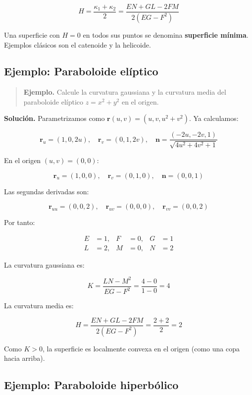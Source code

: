 \documentclass[
]{book}
\begin{document}
\[
H = \frac{\kappa_1 + \kappa_2}{2} = \frac{EN + GL - 2FM}{2(EG - F^2)}
\]

Una superficie con \(H = 0\) en todos sus puntos se denomina \textbf{superficie mínima}. Ejemplos clásicos son el catenoide y la helicoide.

\subsection{Ejemplo: Paraboloide elíptico}\label{ejemplo-paraboloide-eluxedptico}

\begin{quote}
\textbf{Ejemplo.} Calcule la curvatura gaussiana y la curvatura media del paraboloide elíptico \(z = x^2 + y^2\) en el origen.
\end{quote}

\textbf{Solución.} Parametrizamos como \(\mathbf{r}(u, v) = (u, v, u^2 + v^2)\). Ya calculamos:

\[
\mathbf{r}_u = (1, 0, 2u), \quad \mathbf{r}_v = (0, 1, 2v), \quad \mathbf{n} = \frac{(-2u, -2v, 1)}{\sqrt{4u^2 + 4v^2 + 1}}
\]

En el origen \((u, v) = (0, 0)\):

\[
\mathbf{r}_u = (1, 0, 0), \quad \mathbf{r}_v = (0, 1, 0), \quad \mathbf{n} = (0, 0, 1)
\]

Las segundas derivadas son:

\[
\mathbf{r}_{uu} = (0, 0, 2), \quad \mathbf{r}_{uv} = (0, 0, 0), \quad \mathbf{r}_{vv} = (0, 0, 2)
\]

Por tanto:

\[
\begin{aligned}
E &= 1, & F &= 0, & G &= 1 \\
L &= 2, & M &= 0, & N &= 2
\end{aligned}
\]

La curvatura gaussiana es:

\[
K = \frac{LN - M^2}{EG - F^2} = \frac{4 - 0}{1 - 0} = 4
\]

La curvatura media es:

\[
H = \frac{EN + GL - 2FM}{2(EG - F^2)} = \frac{2 + 2}{2} = 2
\]

Como \(K > 0\), la superficie es localmente convexa en el origen (como una copa hacia arriba).

\subsection{Ejemplo: Paraboloide hiperbólico}\label{ejemplo-paraboloide-hiperbuxf3lico}
\end{document}
